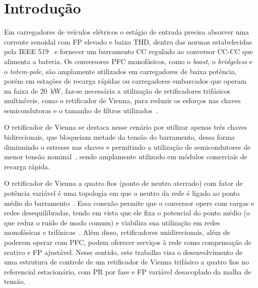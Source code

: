 \section{Introdução}
\label{sec:introducao}

Em carregadores de veículos elétricos o estágio de entrada precisa absorver uma corrente
senoidal com FP elevado e baixo THD, dentro das normas estabelecidas pela IEEE 519~\cite{ieee519}
e fornecer um barramento CC regulado ao conversor CC-CC que alimenta a bateria. Os conversores PFC monofásicos, 
como o \textit{boost}, o \textit{bridgeless} e o \textit{totem-pole}, são amplamente utilizados em carregadores de baixa potência,
porém em estações de recarga rápidas ou carregadores embarcados que operam na faixa de \SI{20}{kW}, faz-se necessária a utilização
de retificadores trifásicos multiníveis, como o retificador de Vienna, para reduzir os esforços nas chaves semicondutoras e o tamanho de filtros utilizados~\cite{yilmaz2013review,tu2019extreme}.

O retificador de Vienna se destaca nesse cenário por utilizar apenas três chaves bidirecionais, que bloqueiam metade da tensão do barramento, 
dessa forma diminuindo o estresse nas chaves e permitindo a utilização de semicondutores de menor tensão nominal~\cite{safayatullah2022comprehensive}, sendo amplamente utilizado em módulos comerciais de recarga rápida.

O retificador de Vienna a quatro fios (ponto de neutro aterrado) com fator de potência variável é uma topologia em que o neutro da rede é ligado ao ponto médio do barramento~\cite{alahuhtala2006fourwire}. Essa conexão permite
que o conversor opere com cargas e redes desequilibradas, tendo em vista que ele fixa o potencial do ponto médio (o que reduz o ruído de modo comum) e viabiliza sua utilização em redes monofásicas e trifásicas~\cite{schafmeister2021transformerless}. 
Além disso, retificadores unidirecionais, além de poderem operar com PFC, podem oferecer serviços à rede como compensação de reativo e FP ajustável. 
Nesse sentido, este trabalho visa o desenvolvimento de uma estrutura de controle de um retificador de Vienna trifásico a quatro fios no referencial estacionário, com PR por fase e FP variável desacoplado da malha de tensão.
